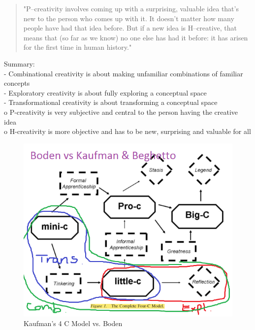 \begin{quote}
	"P–creativity involves coming up with a surprising, valuable idea that’s new to the person who comes up with it. It doesn’t matter how many people have had that idea before. But if a new idea is H–creative, that means that (so far as we know) no one else has had it before: it has arisen for the first time in human history." \citep{Boden2003}
\end{quote}

\begin{shaded}
  Summary:\\
  -	Combinational creativity is about making unfamiliar combinations of familiar concepts\\
  -	Exploratory creativity is about fully exploring a conceptual space\\
  -	Transformational creativity is about transforming a conceptual space\\
  o	P-creativity is very subjective and central to the person having the creative idea\\
  o	H-creativity is more objective and has to be new, surprising and valuable for all
\end{shaded}

\begin{figure}[htb!] %
  \centering
  \includegraphics[width=\linewidth]{images/4CBoden.png}
\caption[Kaufman vs Boden]{Kaufman's 4 C Model vs. Boden}
\label{fig:4CB}
\end{figure}

